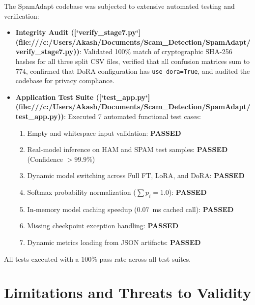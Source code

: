 \documentclass[conference]{IEEEtran}
\begin{document}
The SpamAdapt codebase was subjected to extensive automated testing and verification:
\begin{itemize}
    \item \textbf{Integrity Audit ([`verify_stage7.py`](file:///c:/Users/Akash/Documents/Scam_Detection/SpamAdapt/verify_stage7.py))}: Validated 100\% match of cryptographic SHA-256 hashes for all three split CSV files, verified that all confusion matrices sum to 774, confirmed that DoRA configuration has \texttt{use\_dora=True}, and audited the codebase for privacy compliance.
    \item \textbf{Application Test Suite ([`test_app.py`](file:///c:/Users/Akash/Documents/Scam_Detection/SpamAdapt/test_app.py))}: Executed 7 automated functional test cases:
    \begin{enumerate}
        \item Empty and whitespace input validation: \textbf{PASSED}
        \item Real-model inference on HAM and SPAM test samples: \textbf{PASSED} (Confidence $>99.9\%$)
        \item Dynamic model switching across Full FT, LoRA, and DoRA: \textbf{PASSED}
        \item Softmax probability normalization ($\sum p_i = 1.0$): \textbf{PASSED}
        \item In-memory model caching speedup ($0.07$~ms cached call): \textbf{PASSED}
        \item Missing checkpoint exception handling: \textbf{PASSED}
        \item Dynamic metrics loading from JSON artifacts: \textbf{PASSED}
    \end{enumerate}
\end{itemize}
All tests executed with a 100\% pass rate across all test suites.

\section{Limitations and Threats to Validity}
\label{sec:limitations}
\end{document}
